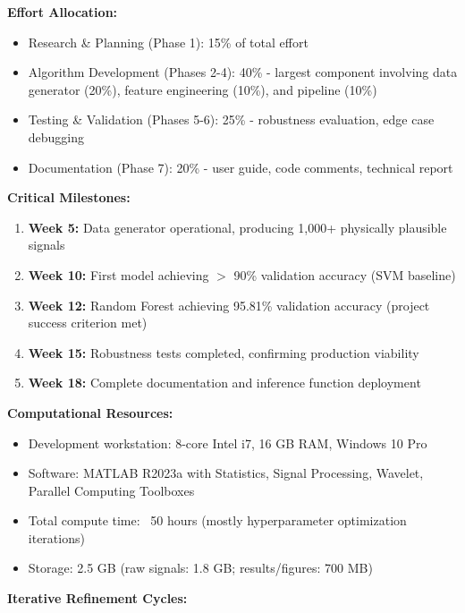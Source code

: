 \documentclass[11pt,a4paper]{article}
\begin{document}
\textbf{Effort Allocation:}
\begin{itemize}[itemsep=0.2em]
    \item Research \& Planning (Phase 1): 15\% of total effort
    \item Algorithm Development (Phases 2-4): 40\% - largest component involving data generator (20\%), feature engineering (10\%), and pipeline (10\%)
    \item Testing \& Validation (Phases 5-6): 25\% - robustness evaluation, edge case debugging
    \item Documentation (Phase 7): 20\% - user guide, code comments, technical report
\end{itemize}

\textbf{Critical Milestones:}
\begin{enumerate}[itemsep=0.3em]
    \item \textbf{Week 5:} Data generator operational, producing 1,000+ physically plausible signals
    \item \textbf{Week 10:} First model achieving  $>$ 90\% validation accuracy (SVM baseline)
    \item \textbf{Week 12:} Random Forest achieving 95.81\% validation accuracy (project success criterion met)
    \item \textbf{Week 15:} Robustness tests completed, confirming production viability
    \item \textbf{Week 18:} Complete documentation and inference function deployment
\end{enumerate}

\textbf{Computational Resources:}
\begin{itemize}[itemsep=0.2em]
    \item Development workstation: 8-core Intel i7, 16 GB RAM, Windows 10 Pro
    \item Software: MATLAB R2023a with Statistics, Signal Processing, Wavelet, Parallel Computing Toolboxes
    \item Total compute time: ~50 hours (mostly hyperparameter optimization iterations)
    \item Storage: 2.5 GB (raw signals: 1.8 GB; results/figures: 700 MB)
\end{itemize}

\textbf{Iterative Refinement Cycles:}
\end{document}
